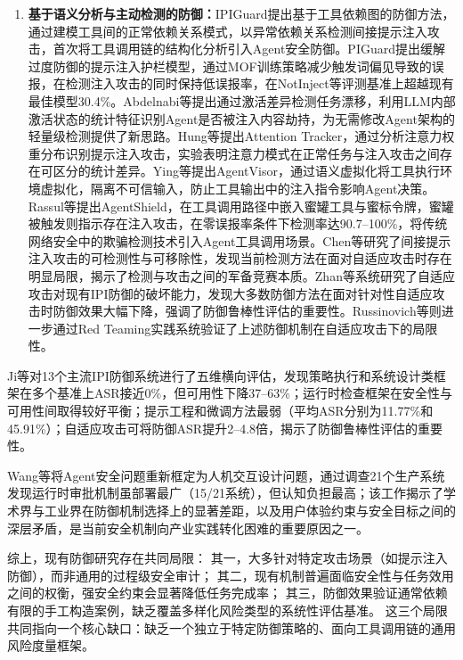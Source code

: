 \begin{enumerate}
  \item \textbf{基于语义分析与主动检测的防御：}IPIGuard\cite{an2025ipiguard}提出基于工具依赖图的防御方法，通过建模工具间的正常依赖关系模式，以异常依赖关系检测间接提示注入攻击，首次将工具调用链的结构化分析引入Agent安全防御。PIGuard\cite{li2025piguard}提出缓解过度防御的提示注入护栏模型，通过MOF训练策略减少触发词偏见导致的误报，在检测注入攻击的同时保持低误报率，在NotInject等评测基准上超越现有最佳模型30.4\%。Abdelnabi等\cite{abdelnabi2025drift}提出通过激活差异检测任务漂移，利用LLM内部激活状态的统计特征识别Agent是否被注入内容劫持，为无需修改Agent架构的轻量级检测提供了新思路。Hung等\cite{hung2025attention}提出Attention Tracker，通过分析注意力权重分布识别提示注入攻击，实验表明注意力模式在正常任务与注入攻击之间存在可区分的统计差异。Ying等\cite{ying2026agentvisor}提出AgentVisor，通过语义虚拟化将工具执行环境虚拟化，隔离不可信输入，防止工具输出中的注入指令影响Agent决策。Rassul等\cite{rassul2026agentshield}提出AgentShield，在工具调用路径中嵌入蜜罐工具与蜜标令牌，蜜罐被触发则指示存在注入攻击，在零误报率条件下检测率达90.7--100\%，将传统网络安全中的欺骗检测技术引入Agent工具调用场景。Chen等\cite{chen2025can}研究了间接提示注入攻击的可检测性与可移除性，发现当前检测方法在面对自适应攻击时存在明显局限，揭示了检测与攻击之间的军备竞赛本质。Zhan等\cite{zhan2025adaptive}系统研究了自适应攻击对现有IPI防御的破坏能力，发现大多数防御方法在面对针对性自适应攻击时防御效果大幅下降，强调了防御鲁棒性评估的重要性。Russinovich等\cite{russinovich2025great}则进一步通过Red Teaming实践系统验证了上述防御机制在自适应攻击下的局限性。
\end{enumerate}

Ji等\cite{ji2025taxonomy}对13个主流IPI防御系统进行了五维横向评估，发现策略执行和系统设计类框架在多个基准上ASR接近0\%，但可用性下降37--63\%；运行时检查框架在安全性与可用性间取得较好平衡；提示工程和微调方法最弱（平均ASR分别为11.77\%和45.91\%）；自适应攻击可将防御ASR提升2--4.8倍，揭示了防御鲁棒性评估的重要性。

Wang等\cite{wang2026reframing}将Agent安全问题重新框定为人机交互设计问题，通过调查21个生产系统发现运行时审批机制虽部署最广（15/21系统），但认知负担最高；该工作揭示了学术界与工业界在防御机制选择上的显著差距，以及用户体验约束与安全目标之间的深层矛盾，是当前安全机制向产业实践转化困难的重要原因之一。

综上，现有防御研究存在共同局限：
其一，大多针对特定攻击场景（如提示注入防御），而非通用的过程级安全审计；
其二，现有机制普遍面临安全性与任务效用之间的权衡，强安全约束会显著降低任务完成率；
其三，防御效果验证通常依赖有限的手工构造案例，缺乏覆盖多样化风险类型的系统性评估基准。
这三个局限共同指向一个核心缺口：缺乏一个独立于特定防御策略的、面向工具调用链的通用风险度量框架。

